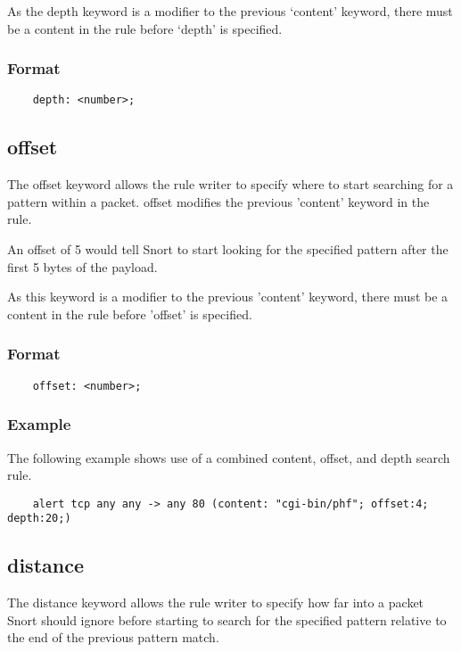 \documentclass[english]{report}
\begin{document}
As the depth keyword is a modifier to the previous `content' keyword, there
must be a content in the rule before `depth' is specified.

\subsubsection{Format}

\begin{verbatim}
    depth: <number>;
\end{verbatim}

\subsection{offset}
\label{sub:offset}

The offset keyword allows the rule writer to specify where to start searching
for a pattern within a packet.  offset modifies the previous 'content' keyword
in the rule.

An offset of 5 would tell Snort to start looking for the specified pattern
after the first 5 bytes of the payload.

As this keyword is a modifier to the previous 'content' keyword, there must be
a content in the rule before 'offset' is specified.

\subsubsection{Format}

\begin{verbatim}
    offset: <number>;
\end{verbatim}

\subsubsection{Example}

The following example shows use of a combined content, offset, and depth search
rule.

\begin{verbatim}
    alert tcp any any -> any 80 (content: "cgi-bin/phf"; offset:4; depth:20;)
\end{verbatim}

\subsection{distance}
\label{sub:Distance}

The distance keyword allows the rule writer to specify how far into a packet
Snort should ignore before starting to search for the specified pattern
relative to the end of the previous pattern match.  
\end{document}
